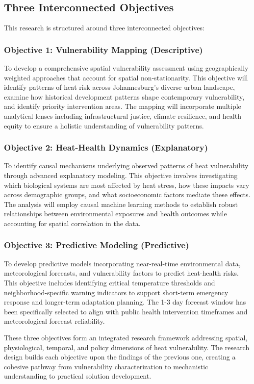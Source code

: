 \subsection{Three Interconnected Objectives}
This research is structured around three interconnected objectives:

\subsubsection{Objective 1: Vulnerability Mapping (Descriptive)}
To develop a comprehensive spatial vulnerability assessment using geographically weighted approaches that account for spatial non-stationarity. This objective will identify patterns of heat risk across Johannesburg's diverse urban landscape, examine how historical development patterns shape contemporary vulnerability, and identify priority intervention areas. The mapping will incorporate multiple analytical lenses including infrastructural justice, climate resilience, and health equity to ensure a holistic understanding of vulnerability patterns.

\subsubsection{Objective 2: Heat-Health Dynamics (Explanatory)}
To identify causal mechanisms underlying observed patterns of heat vulnerability through advanced explanatory modeling. This objective involves investigating which biological systems are most affected by heat stress, how these impacts vary across demographic groups, and what socioeconomic factors mediate these effects. The analysis will employ causal machine learning methods to establish robust relationships between environmental exposures and health outcomes while accounting for spatial correlation in the data.

\subsubsection{Objective 3: Predictive Modeling (Predictive)}
To develop predictive models incorporating near-real-time environmental data, meteorological forecasts, and vulnerability factors to predict heat-health risks. This objective includes identifying critical temperature thresholds and neighborhood-specific warning indicators to support short-term emergency response and longer-term adaptation planning. The 1-3 day forecast window has been specifically selected to align with public health intervention timeframes and meteorological forecast reliability.

These three objectives form an integrated research framework addressing spatial, physiological, temporal, and policy dimensions of heat vulnerability. The research design builds each objective upon the findings of the previous one, creating a cohesive pathway from vulnerability characterization to mechanistic understanding to practical solution development.
